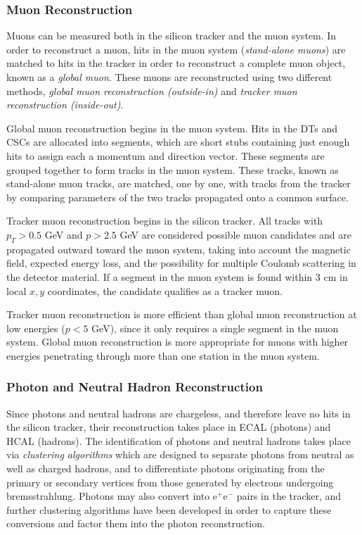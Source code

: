 \subsubsection{Muon Reconstruction}

Muons can be measured both in the silicon tracker and the muon system. In order to reconstruct a muon, hits in the muon system (\emph{stand-alone muons}) are matched to hits in the tracker in order to reconstruct a complete muon object, known as a \emph{global muon}. These muons are reconstructed using two different methods, \emph{global muon reconstruction (outside-in)} and \emph{tracker muon reconstruction (inside-out)}.

Global muon reconstruction begins in the muon system. Hits in the DTs and CSCs are allocated into segments, which are short stubs containing just enough hits to assign each a momentum and direction vector. These segments are grouped together to form tracks in the muon system. These tracks, known as stand-alone muon tracks, are matched, one by one, with tracks from the tracker by comparing parameters of the two tracks propagated onto a common surface.

Tracker muon reconstruction begins in the silicon tracker. All tracks with $p_{T} > 0.5$ GeV and $p > 2.5$ GeV are considered possible muon candidates and are propagated outward toward the muon system, taking into account the magnetic field, expected energy loss, and the possibility for multiple Coulomb scattering in the detector material. If a segment in the muon system is found within 3 cm in local $x, y$ coordinates, the candidate qualifies as a tracker muon.

Tracker muon reconstruction is more efficient than global muon reconstruction at low energies ($p < 5$ GeV), since it only requires a single segment in the muon system. Global muon reconstruction is more appropriate for muons with higher energies penetrating through more than one station in the muon system.


\subsubsection{Photon and Neutral Hadron Reconstruction}

Since photons and neutral hadrons are chargeless, and therefore leave no hits in the silicon tracker, their reconstruction takes place in ECAL (photons) and HCAL (hadrons). The identification of photons and neutral hadrons takes place via \textit{clustering algorithms} which are designed to separate photons from neutral as well as charged hadrons, and to differentiate photons originating from the primary or secondary vertices from those generated by electrons undergoing bremsstrahlung. Photons may also convert into e$^+$e$^-$ pairs in the tracker, and further clustering algorithms have been developed in order to capture these conversions and factor them into the photon reconstruction.

